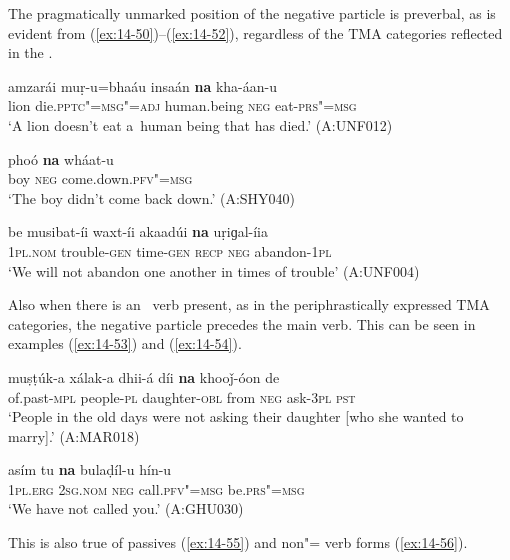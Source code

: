 The pragmatically unmarked position of the negative particle is preverbal, as is evident from (\ref{ex:14-50})--(\ref{ex:14-52}), regardless of the TMA categories reflected in the .

\begin{exe}
\ex
\label{ex:14-50}
\gll amzarái muṛ-u=bhaáu insaán \textbf{na} kha-áan-u \\
lion die.\textsc{pptc"=msg"=adj} human.being \textsc{neg} eat-\textsc{prs"=msg} \\
\glt `A lion doesn't eat a~human being that has died.' (A:UNF012)

\ex
\label{ex:14-51}
\gll phoó \textbf{na} wháat-u \\
boy \textsc{neg} come.down.\textsc{pfv"=msg } \\
\glt `The boy didn't come back down.' (A:SHY040)

\ex
\label{ex:14-52}
\gll be musibat-íi waxt-íi akaadúi \textbf{na} uṛiɡal-íia\\
\textsc{1pl.nom} trouble-\textsc{gen} time-\textsc{gen} \textsc{recp} \textsc{neg} abandon-\textsc{1pl}\\
\glt `We will not abandon one another in times of trouble' (A:UNF004)
\end{exe}

Also when there is an~ verb present, as in the periphrastically expressed TMA categories, the negative particle precedes the main verb. This can be seen in examples (\ref{ex:14-53}) and (\ref{ex:14-54}).

\begin{exe}
\ex
\label{ex:14-53}
\gll muṣṭúk-a xálak-a dhii-á díi \textbf{na} khooǰ-óon de \\
of.past-\textsc{mpl} people-\textsc{pl} daughter-\textsc{obl} from \textsc{neg} ask-\textsc{3pl} \textsc{pst}  \\
\glt `People in the old days were not asking their daughter [who she wanted to marry].' (A:MAR018)

\ex
\label{ex:14-54}
\gll asím tu \textbf{na} bulaḍíl-u hín-u \\
\textsc{1pl.erg} \textsc{2sg.nom} \textsc{neg} call.\textsc{pfv"=msg} be.\textsc{prs"=msg} \\
\glt `We have not called you.' (A:GHU030)
\end{exe}

This is also true of passives (\ref{ex:14-55}) and non"= verb forms (\ref{ex:14-56}).

